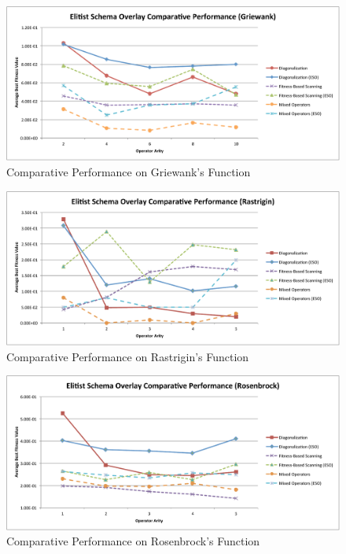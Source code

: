 \begin{figure}[htbp!]
\centering
\includegraphics[scale=0.55]{charts/Both_Griewank.pdf}
\caption{Comparative Performance on Griewank's Function}
\label{fig:both_griewank}
\end{figure}

\begin{figure}[htbp!]
\centering
\includegraphics[scale=0.55]{charts/Both_Rastrigin.pdf}
\caption{Comparative Performance on Rastrigin's Function}
\label{fig:both_rastrigin}
\end{figure}

\begin{figure}[htbp!]
\centering
\includegraphics[scale=0.55]{charts/Both_Rosenbrock.pdf}
\caption{Comparative Performance on Rosenbrock's Function}
\label{fig:both_rosenbrock}
\end{figure}

